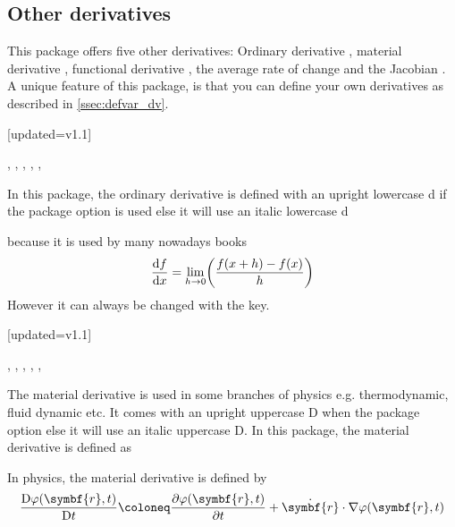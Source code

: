 \subsection{Other derivatives}
This package offers five other derivatives: Ordinary derivative \macro{\odv}, material derivative \macro{\mdv}, functional derivative \macro{\fdv}, the average rate of change \macro{\adv} and the Jacobian \macro{\jdv}. A unique feature of this package, is that you can define your own derivatives as described in \cref{ssec:defvar_dv}.

\begin{function}{\odv}[updated=v1.1]
	\begin{syntax}
		\sarg, , , \targ{/}, , 
	\end{syntax}
	In this package, the ordinary derivative is defined with an upright lowercase d if the package option  is used else it will use an italic lowercase d
	\begin{definition}
	\end{definition}
	because it is used by many nowadays books
	\begin{equation*}
		\odv{f}{x} = \lim_{h\to 0} \mleft( \frac{ f(x+h) - f(x) }{ h } \mright)
	\end{equation*}
	However it can always be changed with the  key.
\end{function}

\begin{function}{\mdv}[updated=v1.1]
	\begin{syntax}
		\sarg, , , \targ{/}, , \earg{\_, point\tsb{1}, \^, point\tsb{2}}
	\end{syntax}
	The material derivative is used in some branches of physics e.g. thermodynamic, fluid dynamic etc. It comes with an upright uppercase D when the package option  else it will use an italic uppercase D. In this package, the material derivative is defined as
	
	\begin{definition}
	\end{definition}
	
	\noindent In physics, the material derivative is defined by
	\begin{equation*}
		\mdv{ \varphi(\symbf{r}, t) }{ t } \coloneq \pdv{ \varphi(\symbf{r}, t) }{ t } + \dot{\symbf{r}} \cdot \nabla \varphi(\symbf{r}, t)
	\end{equation*}
\end{function}

